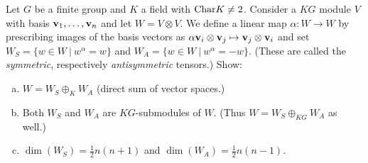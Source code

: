 \documentclass[leqno]{article}
\begin{document}
\setcounter{problem}{13}
\newpage
\begin{problem}
Let $G$ be a finite group and $K$ a field with $\mathrm{Char} K\neq 2$. Consider a $KG$ module $V$ with basis $\mathbf{v}_1,\dots,\mathbf{v}_n$ and let $W=V\otimes V$. We define a linear map $\alpha \colon W \to W$ by prescribing images of the basis vectors as $\alpha \mathbf{v}_i\otimes \mathbf{v}_j\mapsto \mathbf{v}_j\otimes \mathbf{v}_i$ and set $W_S = \{w\in W ~\vert~ w^\alpha = w\}$ and $W_A=\{w\in W~\vert~ w^\alpha = - w\}$. (These are called the \emph{symmetric}, respectively \emph{antisymmetric} tensors.) Show:
\begin{enumerate}[(a)]
    \item $W=W_S \oplus_K W_A$ (direct sum of vector spaces.)
    \item Both $W_S$ and $W_A$ are $KG$-submodules of $W$. (Thus $W=W_S \oplus_{KG} W_A$ as well.)
    \item $\dim(W_S)=\frac{1}{2}n(n+1)$ and $\dim(W_A)=\frac{1}{2}n(n-1)$.
\end{enumerate}
\end{problem}
\end{document}
